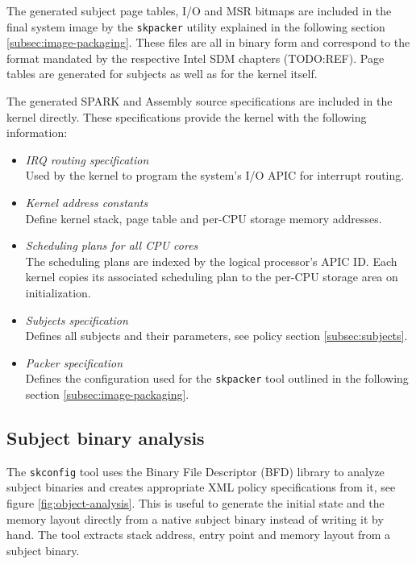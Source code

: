 The generated subject page tables, I/O and MSR bitmaps are included in the final
system image by the \texttt{skpacker} utility explained in the following section
\ref{subsec:image-packaging}. These files are all in binary form and correspond
to the format mandated by the respective Intel SDM chapters (TODO:REF). Page
tables are generated for subjects as well as for the kernel itself.

The generated SPARK and Assembly source specifications are included in the
kernel directly. These specifications provide the kernel with the following
information:

\begin{itemize}
	\item \emph{IRQ routing specification}\\
		Used by the kernel to program the system's I/O APIC for interrupt
		routing.
	\item \emph{Kernel address constants}\\
		Define kernel stack, page table and per-CPU storage memory addresses.
	\item \emph{Scheduling plans for all CPU cores}\\
		The scheduling plans are indexed by the logical processor's APIC ID.
		Each kernel copies its associated scheduling plan to the per-CPU storage
		area on initialization.
	\item \emph{Subjects specification}\\
		Defines all subjects and their parameters, see policy section
		\ref{subsec:subjects}.
	\item \emph{Packer specification}\\
		Defines the configuration used for the \texttt{skpacker} tool outlined
		in the following section \ref{subsec:image-packaging}.
\end{itemize}

\subsection{Subject binary analysis}\label{subsec:subject-binary-analysis}
The \texttt{skconfig} tool uses the Binary File Descriptor (BFD)
library to analyze subject binaries and creates appropriate XML
policy specifications from it, see figure \ref{fig:object-analysis}. This is
useful to generate the initial state and the memory layout directly from a
native subject binary instead of writing it by hand. The tool extracts stack
address, entry point and memory layout from a subject binary.

